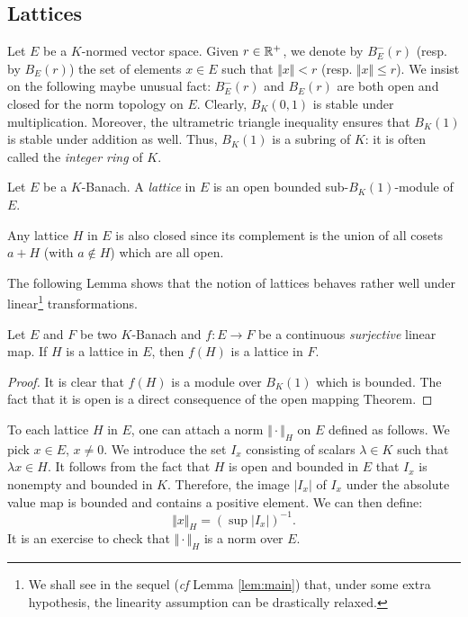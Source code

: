 \documentclass{lms}
\begin{document}
\subsection{Lattices}

Let $E$ be a $K$-normed vector space. Given $r \in \mathbb R^+$, 
we denote by $B^-_E(r)$ (resp. by $B_E(r)$) the set of elements $x 
\in E$ such that $\Vert x \Vert < r$ (resp. $\Vert x \Vert \leq r$). 
We insist on the following maybe unusual fact: $B^-_E(r)$ and 
$B_E(r)$ are both open and closed for the norm topology on $E$.
Clearly, $B_K(0,1)$ is stable under multiplication. Moreover, the 
ultrametric triangle inequality ensures that $B_K(1)$ is stable under 
addition as well. Thus, $B_K(1)$ is a subring of $K$: it is often 
called the \emph{integer ring} of $K$.

\begin{deftn}
Let $E$ be a $K$-Banach.
A \emph{lattice} in $E$ is an open bounded sub-$B_K(1)$-module of $E$.
\end{deftn}

\begin{rmk}
Any lattice $H$ in $E$ is also closed since its complement is the
union of all cosets $a + H$ (with $a \not\in H$) which are all open.
\end{rmk}

The following Lemma shows that the notion of lattices behaves rather 
well under linear\footnote{We shall see in the sequel (\emph{cf} Lemma 
\ref{lem:main}) that, under some extra hypothesis, the linearity 
assumption can be drastically relaxed.} transformations.

\begin{lem}
\label{lem:morlat}
Let $E$ and $F$ be two $K$-Banach and $f : 
E \to F$ be a continuous \emph{surjective} linear map.
If $H$ is a lattice in $E$, then $f(H)$ is a lattice in $F$.
\end{lem}

\begin{proof}
It is clear that $f(H)$ is a module over $B_K(1)$ which is bounded.
The fact that it is open is a direct consequence of the open mapping
Theorem.
\end{proof}

To each lattice $H$ in $E$, one can attach a norm $\Vert \cdot \Vert_H$ 
on $E$ defined as follows. We pick $x \in E$, $x \neq 0$. We introduce
the set $I_x$ consisting of scalars $\lambda \in K$ such that $\lambda x 
\in H$. It follows from the fact that $H$ is open and bounded in $E$
that $I_x$ is nonempty and bounded in $K$. Therefore, the image $|I_x|$ 
of $I_x$ under the absolute value map is bounded and contains a positive
element. We can then define:
$$\Vert x \Vert_H = (\sup |I_x|)^{-1}.$$
It is an exercise to check that $\Vert \cdot \Vert_H$ is a norm over 
$E$.
\end{document}
